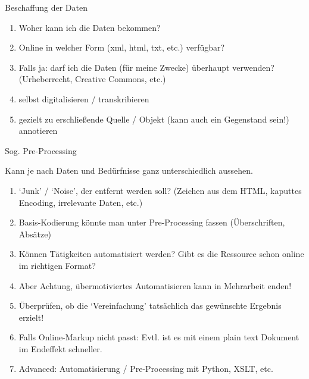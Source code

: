 \begin{frame}[allowframebreaks]{Beschaffung der Daten}

\begin{enumerate}
    \item Woher kann ich die Daten bekommen? 
    \item Online in welcher Form (xml, html, txt, etc.) verfügbar?
    \item Falls ja: darf ich die Daten (für meine Zwecke) überhaupt verwenden? (Urheberrecht, Creative Commons, etc.)
    \item selbst digitalisieren / transkribieren
    \item gezielt zu erschließende Quelle / Objekt (kann auch ein Gegenstand sein!) annotieren
\end{enumerate}

\end{frame}

\begin{frame}[allowframebreaks]{Sog. Pre-Processing}

 Kann je nach Daten und Bedürfnisse ganz unterschiedlich aussehen. \\
 
\begin{enumerate}
    \item `Junk' / `Noise', der entfernt werden soll? (Zeichen aus dem HTML, kaputtes Encoding, irrelevante Daten, etc.)
    \item Basis-Kodierung könnte man unter Pre-Processing fassen (Überschriften, Absätze)
    \item Können Tätigkeiten automatisiert werden? Gibt es die Ressource schon online im richtigen Format?
    \item Aber Achtung, übermotiviertes Automatisieren kann in Mehrarbeit enden!
    \item Überprüfen, ob die `Vereinfachung' tatsächlich das gewünschte Ergebnis erzielt!
    \item Falls Online-Markup nicht passt: Evtl. ist es mit einem plain text Dokument im Endeffekt schneller. 
    \item Advanced: Automatisierung / Pre-Processing mit Python, XSLT, etc.
\end{enumerate}

\end{frame}

